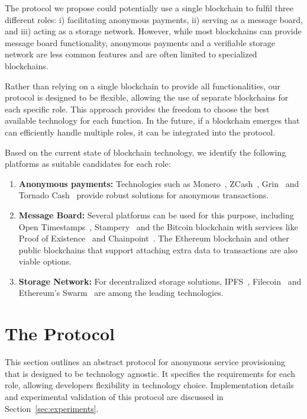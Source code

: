 \documentclass[pdftex,twocolumn,epjc3]{svjour3}
\begin{document}
\begin{sloppypar}
The protocol we propose could potentially use a single blockchain to fulfil three different roles: i) facilitating anonymous payments, ii) serving as a message board, and iii) acting as a storage network. However, while most blockchains can provide message board functionality, anonymous payments and a verifiable storage network are less common features and are often limited to specialized blockchains.

Rather than relying on a single blockchain to provide all functionalities, our protocol is designed to be flexible, allowing the use of separate blockchains for each specific role. This approach provides the freedom to choose the best available technology for each function. In the future, if a blockchain emerges that can efficiently handle multiple roles, it can be integrated into the protocol.

Based on the current state of blockchain technology, we identify the following platforms as suitable candidates for each role:
\begin{enumerate}
  \item \textbf{Anonymous payments:} Technologies such as Monero~\cite{vansaberhagenCryptoNote2013}, ZCash~\cite{ben-sassonZerocashDecentralizedAnonymous2014}, Grin~\cite{fuchsbauerAggregateCashSystems2019} and Tornado Cash~\cite{pertsevTornadoCashPrivacy2019} provide robust solutions for anonymous transactions.
  \item \textbf{Message Board:} Several platforms can be used for this purpose, including Open Timestamps~\cite{opentimestampsTimestampingProofStandard}, Stampery~\cite{crespoStamperyBlockchainTimestamping2017} and the Bitcoin blockchain with services like Proof of Existence~\cite{proofofexistenceWebApplicationProve} and Chainpoint~\cite{chainpointBlockchainProofAnchoring}. The Ethereum blockchain and other public blockchains that support attaching extra data to transactions are also viable options.
  \item \textbf{Storage Network:} For decentralized storage solutions, IPFS~\cite{benetIPFSContentAddressed2014}, Filecoin~\cite{protocollabsFilecoinDecentralizedStorage2017} and Ethereum's Swarm~\cite{teamSWARMStorageCommunication2021} are among the leading technologies.
\end{enumerate}
\end{sloppypar}

\section{The Protocol}\label{sec:protocol}
This section outlines an abstract protocol for anonymous service provisioning that is designed to be technology agnostic. It specifies the requirements for each role, allowing developers flexibility in technology choice. Implementation details and experimental validation of this protocol are discussed in Section~\ref{sec:experiments}.
\end{document}
